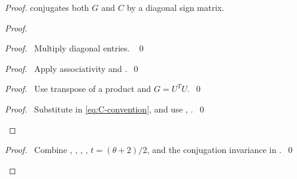 \begin{proof}
{conjugates both $G$ and $C$ by a diagonal sign matrix.}
\begin{proof}
\begin{proof}\pf\ Multiply diagonal entries. ~\qed\end{proof}
\begin{proof}\pf\ Apply associativity and .~\qed\end{proof}
\begin{proof}\pf\ Use transpose of a product and $G=U^TU$.~\qed\end{proof}
\qedstep
\begin{proof}\pf\ Substitute  in
\eqref{eq:C-convention}, and use ,
.~\qed\end{proof}
\end{proof}
\qedstep
\begin{proof}\pf\ Combine , ,
, , $t=(\theta+2)/2$, and
the conjugation invariance in .~\qed\end{proof}
\end{proof}

